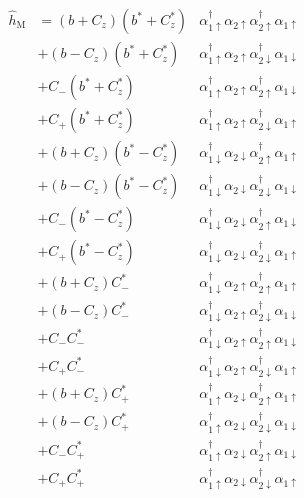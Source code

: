 \documentclass[a4paper, 12pt]{article}
\begin{document}
\begin{equation}
  \label{eq:hM-mid1}
  \begin{aligned}
    \widehat{h}_{\text{M}} 
    &= (b+C_z)(b^*+C^*_z)&\alpha_{1\uparrow}^{\dagger}\alpha_{2\uparrow}\alpha_{2\uparrow}^{\dagger}\alpha_{1\uparrow} \\
    &+ (b-C_z)(b^*+C^*_z)&\alpha_{1\uparrow}^{\dagger}\alpha_{2\uparrow}\alpha_{2\downarrow}^{\dagger}\alpha_{1\downarrow}\\ 
    &+ C_{-}(b^*+C^*_z)&\alpha_{1\uparrow}^{\dagger}\alpha_{2\uparrow}\alpha_{2\uparrow}^{\dagger}\alpha_{1\downarrow} \\
    &+ C_{+}(b^*+C^*_z)&\alpha_{1\uparrow}^{\dagger}\alpha_{2\uparrow}\alpha_{2\downarrow}^{\dagger}\alpha_{1\uparrow}\\
    &+ (b+C_z)(b^*-C^*_z)&\alpha_{1\downarrow}^{\dagger}\alpha_{2\downarrow}\alpha_{2\uparrow}^{\dagger}\alpha_{1\uparrow} \\
    &+ (b-C_z)(b^*-C^*_z)&\alpha_{1\downarrow}^{\dagger}\alpha_{2\downarrow}\alpha_{2\downarrow}^{\dagger}\alpha_{1\downarrow}\\ 
    &+ C_{-}(b^*-C^*_z)&\alpha_{1\downarrow}^{\dagger}\alpha_{2\downarrow}\alpha_{2\uparrow}^{\dagger}\alpha_{1\downarrow} \\
    &+ C_{+}(b^*-C^*_z)&\alpha_{1\downarrow}^{\dagger}\alpha_{2\downarrow}\alpha_{2\downarrow}^{\dagger}\alpha_{1\uparrow}\\
    &+ (b+C_z)C^*_{-}&\alpha_{1\downarrow}^{\dagger}\alpha_{2\uparrow}\alpha_{2\uparrow}^{\dagger}\alpha_{1\uparrow} \\
    &+ (b-C_z)C^*_{-}&\alpha_{1\downarrow}^{\dagger}\alpha_{2\uparrow}\alpha_{2\downarrow}^{\dagger}\alpha_{1\downarrow}\\ 
    &+ C_{-}C^*_{-}&\alpha_{1\downarrow}^{\dagger}\alpha_{2\uparrow}\alpha_{2\uparrow}^{\dagger}\alpha_{1\downarrow} \\
    &+ C_{+}C^*_{-}&\alpha_{1\downarrow}^{\dagger}\alpha_{2\uparrow}\alpha_{2\downarrow}^{\dagger}\alpha_{1\uparrow}\\
    &+ (b+C_z)C^*_{+}&\alpha_{1\uparrow}^{\dagger}\alpha_{2\downarrow}\alpha_{2\uparrow}^{\dagger}\alpha_{1\uparrow} \\
    &+ (b-C_z)C^*_{+}&\alpha_{1\uparrow}^{\dagger}\alpha_{2\downarrow}\alpha_{2\downarrow}^{\dagger}\alpha_{1\downarrow}\\ 
    &+ C_{-}C^*_{+}&\alpha_{1\uparrow}^{\dagger}\alpha_{2\downarrow}\alpha_{2\uparrow}^{\dagger}\alpha_{1\downarrow} \\
    &+ C_{+}C^*_{+}&\alpha_{1\uparrow}^{\dagger}\alpha_{2\downarrow}\alpha_{2\downarrow}^{\dagger}\alpha_{1\uparrow}\\
  \end{aligned}
\end{equation}
\end{document}
